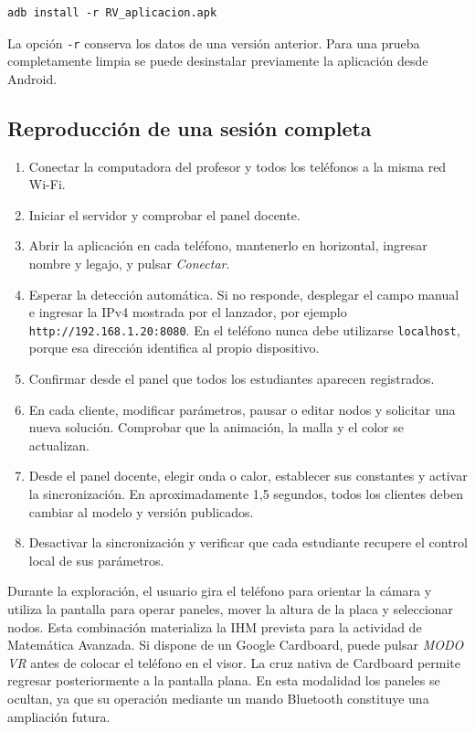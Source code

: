 \begin{lstlisting}[basicstyle=\ttfamily\footnotesize, frame=single, numbers=none,
caption={Instalación opcional mediante ADB.}]
adb install -r RV_aplicacion.apk
\end{lstlisting}

La opción \texttt{-r} conserva los datos de una versión anterior. Para una prueba
completamente limpia se puede desinstalar previamente la aplicación desde Android.

\newpage
\thispagestyle{fancy}
\subsection{Reproducción de una sesión completa}

\begin{enumerate}
    \item Conectar la computadora del profesor y todos los teléfonos a la misma red
    Wi-Fi.
    \item Iniciar el servidor y comprobar el panel docente.
    \item Abrir la aplicación en cada teléfono, mantenerlo en horizontal, ingresar
    nombre y legajo, y pulsar \textit{Conectar}.
    \item Esperar la detección automática. Si no responde, desplegar el campo manual e
    ingresar la IPv4 mostrada por el lanzador, por ejemplo
    \texttt{http://192.168.1.20:8080}. En el teléfono nunca debe utilizarse
    \texttt{localhost}, porque esa dirección identifica al propio dispositivo.
    \item Confirmar desde el panel que todos los estudiantes aparecen registrados.
    \item En cada cliente, modificar parámetros, pausar o editar nodos y solicitar una
    nueva solución. Comprobar que la animación, la malla y el color se actualizan.
    \item Desde el panel docente, elegir onda o calor, establecer sus constantes y
    activar la sincronización. En aproximadamente 1,5 segundos, todos los clientes
    deben cambiar al modelo y versión publicados.
    \item Desactivar la sincronización y verificar que cada estudiante recupere el
    control local de sus parámetros.
\end{enumerate}

Durante la exploración, el usuario gira el teléfono para orientar la cámara y utiliza
la pantalla para operar paneles, mover la altura de la placa y seleccionar nodos. Esta
combinación materializa la IHM prevista para la actividad de Matemática Avanzada.
Si dispone de un Google Cardboard, puede pulsar \textit{MODO VR} antes de colocar el
teléfono en el visor. La cruz nativa de Cardboard permite regresar posteriormente a la
pantalla plana. En esta modalidad los paneles se ocultan, ya que su operación mediante
un mando Bluetooth constituye una ampliación futura.


